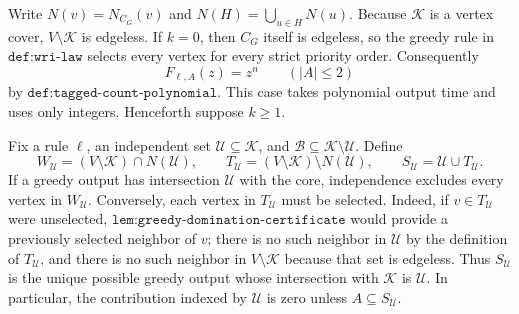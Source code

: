 Write \(N(v)=N_{C_G}(v)\) and \(N(H)=\bigcup_{u\in H}N(u)\).  Because \(\mathcal K\) is a vertex cover, \(V\setminus\mathcal K\) is edgeless.  If \(k=0\), then \(C_G\) itself is edgeless, so the greedy rule in \(\texttt{def:wri-law}\) selects every vertex for every strict priority order.  Consequently
\[
 F_{\ell,A}(z)=z^n
 \qquad (|A|\leq 2)
\]
by \(\texttt{def:tagged-count-polynomial}\).  This case takes polynomial output time and uses only integers.  Henceforth suppose \(k\geq1\).

Fix a rule \(\ell\), an independent set \(\mathcal U\subseteq\mathcal K\), and \(\mathcal B\subseteq\mathcal K\setminus\mathcal U\).  Define
\[
 W_{\mathcal U}=(V\setminus\mathcal K)\cap N(\mathcal U),
 \qquad
 T_{\mathcal U}=(V\setminus\mathcal K)\setminus N(\mathcal U),
 \qquad
 S_{\mathcal U}=\mathcal U\cup T_{\mathcal U}.
\]
If a greedy output has intersection \(\mathcal U\) with the core, independence excludes every vertex in \(W_{\mathcal U}\).  Conversely, each vertex in \(T_{\mathcal U}\) must be selected.  Indeed, if \(v\in T_{\mathcal U}\) were unselected, \(\texttt{lem:greedy-domination-certificate}\) would provide a previously selected neighbor of \(v\); there is no such neighbor in \(\mathcal U\) by the definition of \(T_{\mathcal U}\), and there is no such neighbor in \(V\setminus\mathcal K\) because that set is edgeless.  Thus \(S_{\mathcal U}\) is the unique possible greedy output whose intersection with \(\mathcal K\) is \(\mathcal U\).  In particular, the contribution indexed by \(\mathcal U\) is zero unless \(A\subseteq S_{\mathcal U}\).

